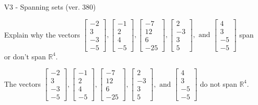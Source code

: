 \begin{exercise}
  \begin{exerciseTitle}V3 - Spanning sets (ver. 380)\end{exerciseTitle}
  \begin{exerciseStatement}
    Explain why the vectors \(\left[\begin{array}{r}
-2 \\
3 \\
-3 \\
-5
\end{array}\right] , \left[\begin{array}{r}
-1 \\
2 \\
4 \\
-5
\end{array}\right] , \left[\begin{array}{r}
-7 \\
12 \\
6 \\
-25
\end{array}\right] , \left[\begin{array}{r}
2 \\
-3 \\
3 \\
5
\end{array}\right] , \text{ and } \left[\begin{array}{r}
4 \\
3 \\
-5 \\
-5
\end{array}\right]\) span or don't span \(\mathbb{R}^4\). 
	


  \end{exerciseStatement}
  \begin{exerciseAnswer}
   The vectors \(\left[\begin{array}{r}
-2 \\
3 \\
-3 \\
-5
\end{array}\right] , \left[\begin{array}{r}
-1 \\
2 \\
4 \\
-5
\end{array}\right] , \left[\begin{array}{r}
-7 \\
12 \\
6 \\
-25
\end{array}\right] , \left[\begin{array}{r}
2 \\
-3 \\
3 \\
5
\end{array}\right] , \text{ and } \left[\begin{array}{r}
4 \\
3 \\
-5 \\
-5
\end{array}\right]\) 
  	 do not  
	span \(\mathbb{R}^4\).
  



\end{exerciseAnswer}
\end{exercise}
